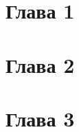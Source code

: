 \newpage
{}
\newpage
\section{Глава 1}
\newpage

\section{Глава 2}
\newpage
\section{Глава 3}
\newpage
{}
